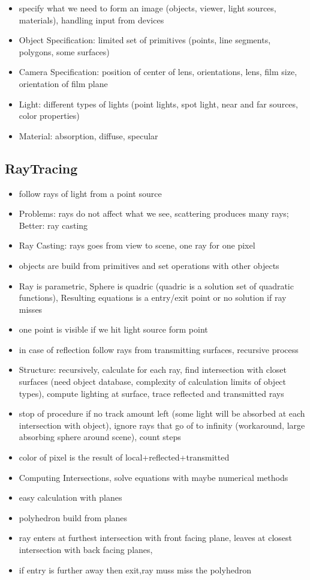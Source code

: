 \documentclass[11pt,a4paper]{article}
\begin{document}
\begin{itemize}
\begin{itemize}
				\item specify what we need to form an image (objects, viewer, light sources, materials), handling input from devices
				\item Object Specification: limited set of primitives (points, line segments, polygons, some surfaces)
				\item Camera Specification: position of center of lens, orientations, lens, film size, orientation of film plane
				\item Light: different types of lights (point lights, spot light, near and far sources, color properties)
				\item Material: absorption, diffuse, specular
			\end{itemize}
		\end{itemize}
	\subsection{RayTracing}
		\begin{itemize}
			\item follow rays of light from a point source
			\item Problems: rays do not affect what we see, scattering produces many rays; Better: ray casting
			\item Ray Casting: rays goes from view to scene, one ray for one pixel
			\item objects are build from primitives and set operations with other objects
			\item Ray is parametric, Sphere is quadric (quadric is a solution set of quadratic functions), Resulting equations is a entry/exit point or no solution if ray misses
			\item one point is visible if we hit light source form point
			\item in case of reflection follow rays from transmitting surfaces, recursive process
			\item Structure: recursively, calculate for each ray, find intersection with closet surfaces (need object database, complexity of calculation limits of object types), compute lighting at surface, trace reflected and transmitted rays
			\item stop of procedure if no track amount left (some light will be absorbed at each intersection with object), ignore rays that go of to infinity (workaround, large absorbing sphere around scene), count steps
			\item color of pixel is the result of local+reflected+transmitted
			\item Computing Intersections, solve equations with maybe numerical methods 
			\item easy calculation with planes
			\item polyhedron build from planes
			\item ray enters at furthest intersection with front facing plane, leaves at closest intersection with back facing planes,
			\item if entry is further away then exit,ray muss miss the polyhedron
		\end{itemize}
\end{document}
